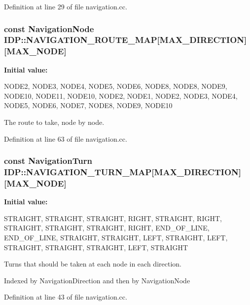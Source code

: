 Definition at line 29 of file navigation.cc.

\hypertarget{namespaceIDP_a33ba7fcc78e0c8e5477d2ed6ac18e48f}{
\subsubsection[{NAVIGATION\_\-ROUTE\_\-MAP}]{\setlength{\rightskip}{0pt plus 5cm}const {\bf NavigationNode} {\bf IDP::NAVIGATION\_\-ROUTE\_\-MAP}\mbox{[}MAX\_\-DIRECTION\mbox{]}\mbox{[}MAX\_\-NODE\mbox{]}}}
\label{namespaceIDP_a33ba7fcc78e0c8e5477d2ed6ac18e48f}
{\bfseries Initial value:}
\begin{DoxyCode}
 {
        {NODE2, NODE3, NODE4, NODE5, NODE6, NODE8, NODE8, NODE9, NODE10,
            NODE11, NODE10},
        {NODE2, NODE1, NODE2, NODE3, NODE4, NODE5, NODE6, NODE7, NODE8,
            NODE9, NODE10}
    }
\end{DoxyCode}


The route to take, node by node. 



Definition at line 63 of file navigation.cc.

\hypertarget{namespaceIDP_a0bada0608b684564e235786b3b38c10a}{
\subsubsection[{NAVIGATION\_\-TURN\_\-MAP}]{\setlength{\rightskip}{0pt plus 5cm}const {\bf NavigationTurn} {\bf IDP::NAVIGATION\_\-TURN\_\-MAP}\mbox{[}MAX\_\-DIRECTION\mbox{]}\mbox{[}MAX\_\-NODE\mbox{]}}}
\label{namespaceIDP_a0bada0608b684564e235786b3b38c10a}
{\bfseries Initial value:}
\begin{DoxyCode}
 {
        {STRAIGHT, STRAIGHT, STRAIGHT, RIGHT, STRAIGHT, RIGHT, STRAIGHT,
            STRAIGHT, STRAIGHT, RIGHT, END_OF_LINE},
        {END_OF_LINE, STRAIGHT, STRAIGHT, LEFT, STRAIGHT, LEFT, STRAIGHT,
            STRAIGHT, STRAIGHT, LEFT, STRAIGHT}
    }
\end{DoxyCode}


Turns that should be taken at each node in each direction. 

Indexed by NavigationDirection and then by NavigationNode 

Definition at line 43 of file navigation.cc.

